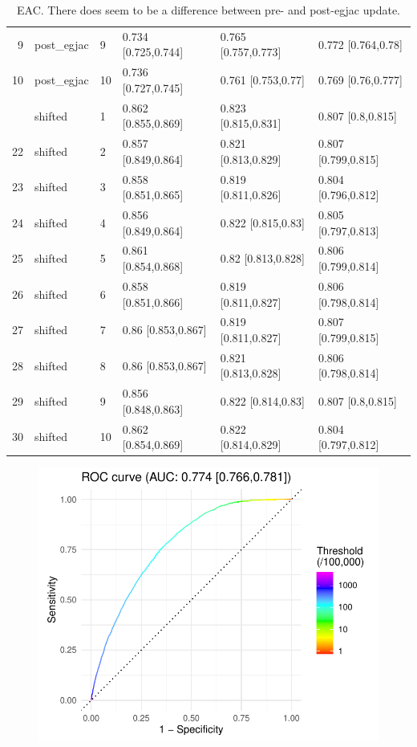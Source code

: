 \documentclass[12pt]{article}
\begin{document}
\begin{table}[ht]
\begin{tabular}{rlllll}
  9 & post\_egjac & 9 & 0.734 [0.725,0.744] & 0.765 [0.757,0.773] & 0.772 [0.764,0.78] \\ 
  10 & post\_egjac & 10 & 0.736 [0.727,0.745] & 0.761 [0.753,0.77] & 0.769 [0.76,0.777] \\ \addlinespace
  21 & shifted & 1 & 0.862 [0.855,0.869] & 0.823 [0.815,0.831] & 0.807 [0.8,0.815] \\ 
  22 & shifted & 2 & 0.857 [0.849,0.864] & 0.821 [0.813,0.829] & 0.807 [0.799,0.815] \\ 
  23 & shifted & 3 & 0.858 [0.851,0.865] & 0.819 [0.811,0.826] & 0.804 [0.796,0.812] \\ 
  24 & shifted & 4 & 0.856 [0.849,0.864] & 0.822 [0.815,0.83] & 0.805 [0.797,0.813] \\ 
  25 & shifted & 5 & 0.861 [0.854,0.868] & 0.82 [0.813,0.828] & 0.806 [0.799,0.814] \\ 
  26 & shifted & 6 & 0.858 [0.851,0.866] & 0.819 [0.811,0.827] & 0.806 [0.798,0.814] \\ 
  27 & shifted & 7 & 0.86 [0.853,0.867] & 0.819 [0.811,0.827] & 0.807 [0.799,0.815] \\ 
  28 & shifted & 8 & 0.86 [0.853,0.867] & 0.821 [0.813,0.828] & 0.806 [0.798,0.814] \\ 
  29 & shifted & 9 & 0.856 [0.848,0.863] & 0.822 [0.814,0.83] & 0.807 [0.8,0.815] \\ 
  30 & shifted & 10 & 0.862 [0.854,0.869] & 0.822 [0.814,0.829] & 0.804 [0.797,0.812] \\ 
   \bottomrule
\end{tabular}
\caption{EAC. There does seem to be a difference between pre- and post-egjac update. }
\end{table}

\clearpage

\begin{figure}[h]
\centering
\includegraphics[width=\textwidth]{figures/roc.pdf}

\end{figure}
\end{document}
